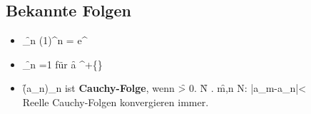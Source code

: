 \subsection{Bekannte Folgen}
\begin{itemize}
    \item \f{\lim_{n \to \infty}(1\pm {})^n = e^{}}
    \item \f{\lim_{n \to \infty}=1} für \f{a \in {}^+\cup \left\{\infty\right\}}
    \item \f{(a_n)_{n\in {}}} ist \textbf{Cauchy-Folge}, wenn \f{\forall \varepsilon > 0.} \f{\exists N \in {}.} \f{\forall m,n \geq N: |a_m-a_n|<\varepsilon}\\
    Reelle Cauchy-Folgen konvergieren immer.
\end{itemize}